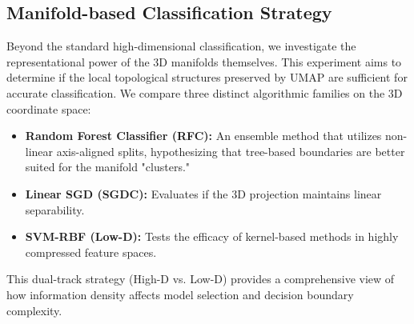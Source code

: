 \subsection{Manifold-based Classification Strategy}
Beyond the standard high-dimensional classification, we investigate the representational power of the 3D manifolds themselves. This experiment aims to determine if the local topological structures preserved by UMAP are sufficient for accurate classification. We compare three distinct algorithmic families on the 3D coordinate space:
\begin{itemize}
    \item \textbf{Random Forest Classifier (RFC):} An ensemble method that utilizes non-linear axis-aligned splits, hypothesizing that tree-based boundaries are better suited for the manifold "clusters."
    \item \textbf{Linear SGD (SGDC):} Evaluates if the 3D projection maintains linear separability.
    \item \textbf{SVM-RBF (Low-D):} Tests the efficacy of kernel-based methods in highly compressed feature spaces.
\end{itemize}
This dual-track strategy (High-D vs. Low-D) provides a comprehensive view of how information density affects model selection and decision boundary complexity.
